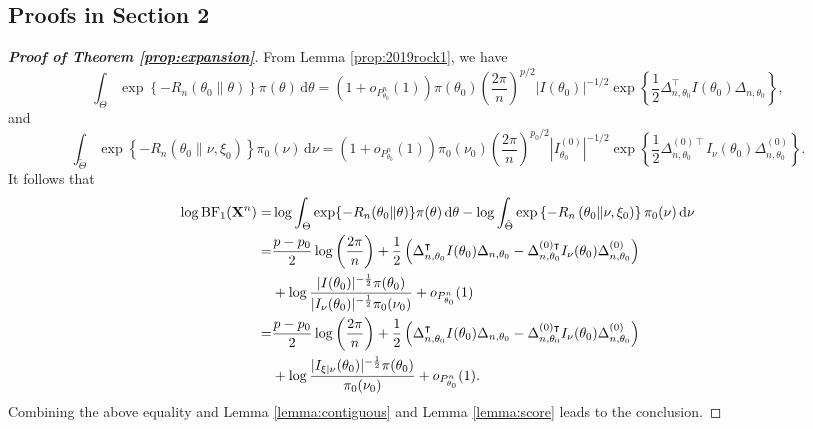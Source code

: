\documentclass[11pt]{article}
\newcommand{\myT}{\intercal}
\theoremstyle{plain}
\theoremstyle{definition}
\theoremstyle{remark}
\begin{document}
\begin{appendices}
\section{Proofs in Section 2}


    \begin{proof}[\textbf{Proof of Theorem \ref{prop:expansion}}]
From Lemma \ref{prop:2019rock1}, we have
$$
    \int_{\Theta}
    \exp\left\{-R_n(\theta_0\| \theta) \right\} \pi(\theta)
\, \mathrm d \theta
    =
    (1+o_{P^n_{\theta_0}}(1))
    \pi(\theta_0)
    \left(\frac{2\pi}{ n}\right)^{{p}/{2}}
    |I(\theta_0)|^{-{1}/{2}} 
    \exp
    \left\{ 
        \frac{1}{2}\Delta_{n,\theta_0}^\myT  I({\theta_0})\Delta_{n,\theta_0}
\right\}
,
$$
and
\begin{equation*}
    \int_{\tilde \Theta}
    \exp\left\{- R_n\left(\theta_0\| \nu, \xi_0 \right)\right\} \pi_0(\nu)
\, \mathrm d \nu
    =
    (1+o_{P^n_{\theta_0}}(1))
    \pi_0(\nu_0)
    \left(\frac{2\pi}{ n}\right)^{{p_0}/{2}}
     |I_{\theta_0}^{(0)}|^{-{1}/{2}} 
     \exp\left\{ 
         \frac{1}{2}\Delta_{n,\theta_0}^{{(0)}\myT} I_{\nu}(\theta_0)\Delta^{(0)}_{n,\theta_0}
     \right\}
     .
\end{equation*}
It follows that
\begin{align*}
    \log \text{BF}_1 (\BX^{n})
    =&
    \log
    \int_{\Theta}
    \exp\{- R_n(\theta_0\| \theta)\} \pi(\theta)
\, \mathrm d \theta
-
    \log \int_{\tilde \Theta}
    \exp\left\{- R_n\left(\theta_0\| \nu, \xi_0 \right)\right\} \pi_0(\nu)
\, \mathrm d \nu
    \\
    =&
   {\frac{p-p_0}{2}} \log \left( \frac{2\pi}{n} \right)
+
        \frac 1 2 \left( 
            \Delta_{n,\theta_0}^\myT  I(\theta_0)  \Delta_{n,\theta_0}
            -
            \Delta_{n,\theta_0}^{{(0)}\myT} I_{\nu}(\theta_0)\Delta^{(0)}_{n,\theta_0}
        \right)
        \\
   &+
   \log
       \frac{
           |I(\theta_0)|^{-\frac 1 2}\pi(\theta_0) 
   }{
       |I_\nu(\theta_0)|^{-\frac 1 2}\pi_0(\nu_0)
}
    +o_{P^n_{\theta_0}}(1)
    \\
    =&
   {\frac{p-p_0}{2}} \log \left( \frac{2\pi}{n} \right)
+
        \frac 1 2 \left( 
            \Delta_{n,\theta_0}^\myT  I(\theta_0)  \Delta_{n,\theta_0}
            -
            \Delta_{n,\theta_0}^{{(0)}\myT} I_{\nu}(\theta_0)\Delta^{(0)}_{n,\theta_0}
        \right)
        \\
   &+
   \log
       \frac{
           |I_{\xi | \nu}(\theta_0)|^{-\frac 1 2}\pi(\theta_0) 
   }{
    \pi_0(\nu_0)
}
    +o_{P^n_{\theta_0}}(1)
    .
\end{align*}
Combining the above equality and Lemma \ref{lemma:contiguous} and Lemma \ref{lemma:score} leads to the conclusion.
    \end{proof}




\end{appendices}
\end{document}
